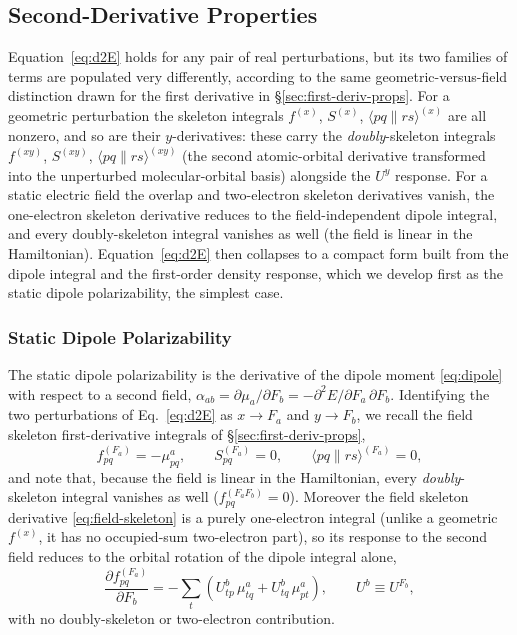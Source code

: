 \documentclass[12pt]{article}
\newcommand{\adb}[2]{\langle #1 \| #2 \rangle}
\begin{document}
\subsection{Second-Derivative Properties}
\label{sec:2nd-props}

Equation~\eqref{eq:d2E} holds for any pair of real perturbations, but its two
families of terms are populated very differently, according to the same
geometric-versus-field distinction drawn for the first derivative in
\S\ref{sec:first-deriv-props}.  For a geometric perturbation the skeleton
integrals $f^{(x)}$, $S^{(x)}$, $\adb{pq}{rs}^{(x)}$ are all nonzero, and so are
their $y$-derivatives: these carry the {\em doubly}-skeleton integrals
$f^{(xy)}$, $S^{(xy)}$, $\adb{pq}{rs}^{(xy)}$ (the second atomic-orbital
derivative transformed into the unperturbed molecular-orbital basis) alongside
the $U^y$ response.  For a static electric field the overlap and two-electron
skeleton derivatives vanish, the one-electron skeleton derivative reduces to the
field-independent dipole integral, and every doubly-skeleton integral vanishes
as well (the field is linear in the Hamiltonian).  Equation~\eqref{eq:d2E} then
collapses to a compact form built from the dipole integral and the first-order
density response, which we develop first as the static dipole polarizability,
the simplest case.

\subsubsection{Static Dipole Polarizability}

The static dipole polarizability is the derivative of the dipole moment
\eqref{eq:dipole} with respect to a second field,
$\alpha_{ab}=\partial\mu_a/\partial F_b=-\partial^2 E/\partial F_a\,\partial F_b$.
Identifying the two perturbations of Eq.~\eqref{eq:d2E} as $x\to F_a$ and
$y\to F_b$, we recall the field skeleton first-derivative integrals of
\S\ref{sec:first-deriv-props},
\begin{equation}
f^{(F_a)}_{pq} = -\mu^a_{pq}, \qquad
S^{(F_a)}_{pq} = 0, \qquad
\adb{pq}{rs}^{(F_a)} = 0,
\label{eq:field-skeleton}
\end{equation}
and note that, because the field is linear in the Hamiltonian, every {\em
doubly}-skeleton integral vanishes as well ($f^{(F_aF_b)}_{pq}=0$).  Moreover the
field skeleton derivative
\eqref{eq:field-skeleton} is a purely one-electron integral (unlike a geometric
$f^{(x)}$, it has no occupied-sum two-electron part), so its response to the
second field reduces to the orbital rotation of the dipole integral alone,
\begin{equation}
\frac{\partial f^{(F_a)}_{pq}}{\partial F_b}
= -\sum_t\left(U^b_{tp}\,\mu^a_{tq} + U^b_{tq}\,\mu^a_{pt}\right),
\qquad U^b \equiv U^{F_b},
\label{eq:dfield}
\end{equation}
with no doubly-skeleton or two-electron contribution.
\end{document}
